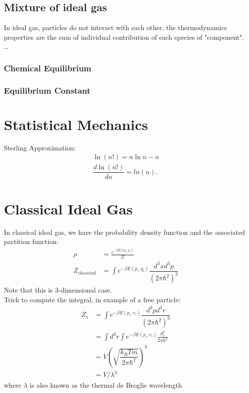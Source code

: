 \documentclass[12pt,a4paper]{article}
\begin{document}
    \subsection {Mixture of ideal gas}
        In ideal gas, particles do not interact with each other, the thermodynamics properties are the sum of individual contribution of each species of "component".
        \dots
        \subsubsection{Chemical Equilibrium}
        \subsubsection{Equilibrium Constant}
\section{Statistical Mechanics}
    \begin{theorem}
        {Sterling Approximation:}
        {
            \begin{align*}
                \ln(n!)= n\ln{n} - n \\
                \dfrac{d\ln(n!)}{dn} = ln(n).
            \end{align*}
            }
    \end{theorem}
        
\section{Classical Ideal Gas}
    In classical ideal gas, we have the probability density function and the associated partition function:
    \begin{align*}
        \rho &= \frac{e^{-\beta E({p_i,q_i})}}{Z}\\
        Z_{classical} &= \int e^{-\beta E({p_i,q_i})} \dfrac{d^3x d^3p}{(2\pi\hbar^2)^3}
    \end{align*}
    Note that this is 3-dimensional case.\\
    Trick to compute the integral, in example of a free particle:
    \begin{align*}
        Z_1 &= \int e^{-\beta E({p_i,r_i})} \dfrac{d^3p d^3r}{(2\pi\hbar^2)^3}\\
            &= \int d^3r \int e^{-\beta E({p_i,r_i})} \frac{d^p_x}{2\pi\hbar^2}\\
            &= V(\sqrt{\dfrac{k_BTm}{2\pi\hbar^2}})^3\\
            &= V/\lambda^3
    \end{align*}
    where $\lambda$ is also known as the thermal de Broglie wavelength
\end{document}
